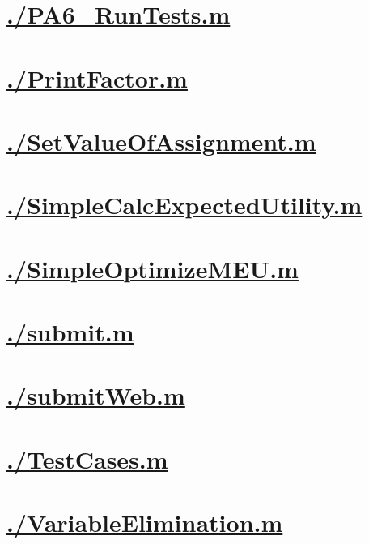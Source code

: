 \documentclass{article}
\begin{document}
\section{\hyperref[toc]{./PA6\_RunTests.m}}

\section{\hyperref[toc]{./PrintFactor.m}}

\section{\hyperref[toc]{./SetValueOfAssignment.m}}

\section{\hyperref[toc]{./SimpleCalcExpectedUtility.m}}

\section{\hyperref[toc]{./SimpleOptimizeMEU.m}}

\section{\hyperref[toc]{./submit.m}}

\section{\hyperref[toc]{./submitWeb.m}}

\section{\hyperref[toc]{./TestCases.m}}

\section{\hyperref[toc]{./VariableElimination.m}}

\end{document}
